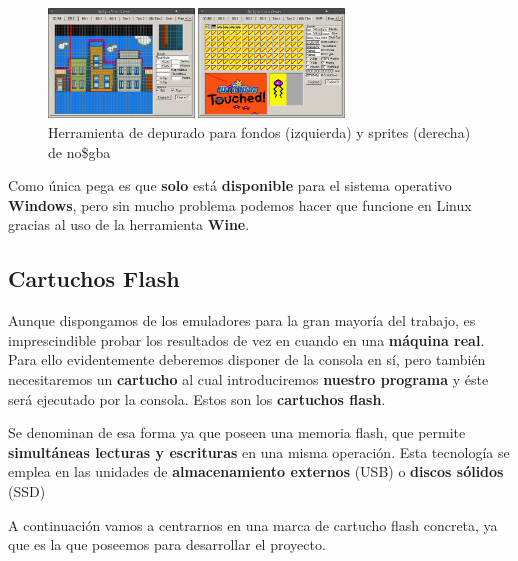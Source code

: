 \begin{figure}[htbp]
\centering
  \includegraphics[width=0.7\textwidth]{archivos/nogba1.png}
  \caption{Herramienta de depurado para fondos (izquierda) y sprites (derecha) de no\$gba}
  \label{fig:nogba1}
\end{figure}

\vspace{0.5cm}

Como única pega es que \textbf{solo} está \textbf{disponible} para el sistema operativo \textbf{Windows}, pero sin mucho problema podemos hacer que funcione en Linux gracias al uso de la herramienta \textbf{Wine}.

\vspace{0.5cm}


\vspace{1cm}

\subsection{Cartuchos Flash}

Aunque dispongamos de los emuladores para la gran mayoría del trabajo, es imprescindible probar los resultados de vez en cuando en una \textbf{máquina real}. Para ello evidentemente deberemos disponer de la consola en sí, pero también necesitaremos un \textbf{cartucho} al cual introduciremos \textbf{nuestro programa} y éste será ejecutado por la consola. Estos son los \textbf{cartuchos flash}. 

\vspace{0.5cm}

Se denominan de esa forma ya que poseen una memoria flash, que permite \textbf{simultáneas lecturas y escrituras} en una misma operación. Esta tecnología se emplea en las unidades de \textbf{almacenamiento externos} (USB) o \textbf{discos sólidos} (SSD)

A continuación vamos a centrarnos en una marca de cartucho flash concreta, ya que es la que poseemos para desarrollar el proyecto.

